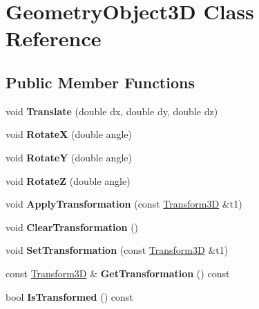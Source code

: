 \hypertarget{classGeometryObject3D}{}\section{Geometry\+Object3D Class Reference}
\label{classGeometryObject3D}
\subsection*{Public Member Functions}
\begin{DoxyCompactItemize}
\item 
\mbox{\label{classGeometryObject3D_a7f2dfeb80ea998ba75c770a4f1835ab0}} 
void {\bfseries Translate} (double dx, double dy, double dz)
\item 
\mbox{\label{classGeometryObject3D_a4d533ab03f321f3ecb158e030e76b843}} 
void {\bfseries RotateX} (double angle)
\item 
\mbox{\label{classGeometryObject3D_a60f7c421b6955fe89b2294b480ef5a8b}} 
void {\bfseries RotateY} (double angle)
\item 
\mbox{\label{classGeometryObject3D_aa852b19ca8cf899006928b6a69515b29}} 
void {\bfseries RotateZ} (double angle)
\item 
\mbox{\label{classGeometryObject3D_a0bcc2b47b93afbb34689a0d0e7933768}} 
void {\bfseries Apply\+Transformation} (const \hyperlink{classTransform3D}{Transform3D} \&t1)
\item 
\mbox{\label{classGeometryObject3D_afd0b4ab47fc23e0b94803fc3da21f700}} 
void {\bfseries Clear\+Transformation} ()
\item 
\mbox{\label{classGeometryObject3D_a5f41e994e521f9ee91bbb3c2392209d9}} 
void {\bfseries Set\+Transformation} (const \hyperlink{classTransform3D}{Transform3D} \&t1)
\item 
\mbox{\label{classGeometryObject3D_ab7d95e970bfefffc954ad161f62a8c5f}} 
const \hyperlink{classTransform3D}{Transform3D} \& {\bfseries Get\+Transformation} () const
\item 
\mbox{\label{classGeometryObject3D_a38c25f94fad20641ea9436c74d80b240}} 
bool {\bfseries Is\+Transformed} () const
\end{DoxyCompactItemize}
